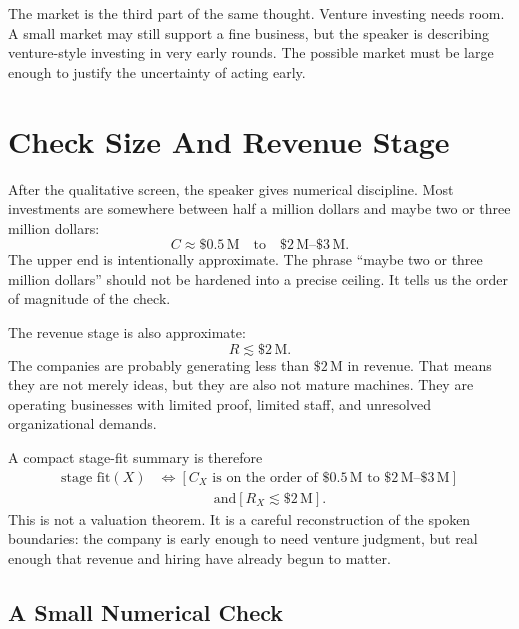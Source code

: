 The market is the third part of the same thought. Venture investing needs room. A small market may still support a fine business, but the speaker is describing venture-style investing in very early rounds. The possible market must be large enough to justify the uncertainty of acting early.

\section{Check Size And Revenue Stage}

After the qualitative screen, the speaker gives numerical discipline. Most investments are somewhere between half a million dollars and maybe two or three million dollars:
\begin{equation}
C
\approx
\$0.5\,\mathrm{M}
\quad \text{to} \quad
\$2\,\mathrm{M}\text{--}\$3\,\mathrm{M}.
\end{equation}
The upper end is intentionally approximate. The phrase ``maybe two or three million dollars'' should not be hardened into a precise ceiling. It tells us the order of magnitude of the check.

The revenue stage is also approximate:
\begin{equation}
R \lesssim \$2\,\mathrm{M}.
\end{equation}
The companies are probably generating less than \( \$2\,\mathrm{M} \) in revenue. That means they are not merely ideas, but they are also not mature machines. They are operating businesses with limited proof, limited staff, and unresolved organizational demands.

A compact stage-fit summary is therefore
\begin{align}
\text{stage fit}(X)
&\Longleftrightarrow
\left[
C_X \text{ is on the order of } \$0.5\,\mathrm{M}
\text{ to }
\$2\,\mathrm{M}\text{--}\$3\,\mathrm{M}
\right] \nonumber\\
&\qquad\qquad
\text{and}
\left[
R_X \lesssim \$2\,\mathrm{M}
\right].
\end{align}
This is not a valuation theorem. It is a careful reconstruction of the spoken boundaries: the company is early enough to need venture judgment, but real enough that revenue and hiring have already begun to matter.

\subsection{A Small Numerical Check}

